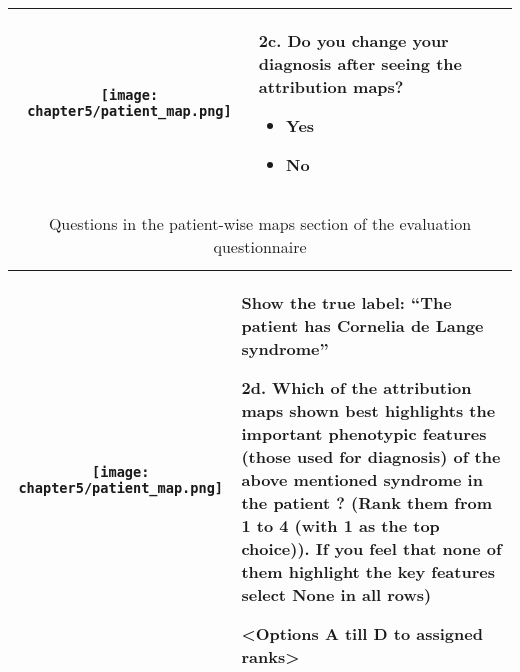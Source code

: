 \documentclass[../report.tex]{subfiles}
\begin{document}
\begin{table}[H]
\begin{tabular}{ | c | m{7cm} |}
   		\centering
   		\begin{minipage}{.49\textwidth}
   			\vspace*{1cm}
   			\centering
   			\texttt{[image: chapter5/patient\_map.png]}
   			
   			\vspace*{1cm}
   		\end{minipage}
   		
   		&
   		
   	   		
   		2c. Do you change your diagnosis after seeing the attribution maps?
   		\begin{itemize}
   			\item Yes
   			\item No
   		\end{itemize}
   		\\ \hline
   	\end{tabular}
   \end{table}
   	\pagebreak
   	
   	\begin{table}
   	
   \begin{tabular}{ | c | m{7cm} |}
   		\hline
	\begin{minipage}{.49\textwidth}
	\vspace*{1cm}
	\centering
	\texttt{[image: chapter5/patient\_map.png]}
	
	\vspace*{0.5cm}
\end{minipage}
   	
   	&
   	\vspace{.25cm}
   	Show the true label: \enquote{The patient has \textbf{Cornelia de Lange syndrome}}
   	
   	\vspace{.25cm}
   	
   	2d. Which of the attribution maps shown best highlights the important phenotypic
   	features (those used for diagnosis) of the above mentioned syndrome in the patient ?
   	(Rank them from 1 to 4 (with 1 as the top choice)). If you feel that none of them
   	highlight the key features select None in all rows)
   	
   	<Options A till D to assigned ranks>		
   	
   	\vspace{.5cm}
   	\\ \hline
   \end{tabular}
   	\caption{Questions in the patient-wise maps section of the evaluation questionnaire}\label{tbl_pat_wise}
   \end{table}
   
\end{document}
